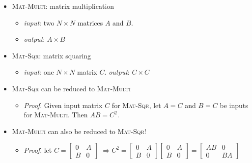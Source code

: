 \documentclass[10pt,landscape]{article}
\newcommand{\1}{\mathmybb{1}}
\begin{document}
\begin{multicols*}{3}
\begin{itemize}[topsep=0pt,noitemsep,wide=0pt, leftmargin=\dimexpr{} + 2\relax]
  \item \textsc{Mat-Multi}: matrix multiplication
    \begin{itemize}[topsep=0pt,noitemsep,wide=0pt, leftmargin=\dimexpr{} + 2\relax]
      \item \textit{input}: two $N \times N$ matrices  $A$ and $B$.
      \item \textit{output}: $A \times B$
    \end{itemize}
  \item \textsc{Mat-Sqr}: matrix squaring
    \begin{itemize}[topsep=0pt,noitemsep,wide=0pt, leftmargin=\dimexpr{} + 2\relax]
      \item \textit{input}: one $N \times N$ matrix $C$. \textit{output}: $C \times C$
    \end{itemize}
  \item \textsc{Mat-Sqr} can be reduced to \textsc{Mat-Multi}
    \begin{itemize}[topsep=0pt,noitemsep,wide=0pt, leftmargin=\dimexpr{} + 2\relax]
      \item \textit{Proof}. Given input matrix $C$ for \textsc{Mat-Sqr}, let $A=C$ and  $B=C$ be inputs for \textsc{Mat-Multi}. Then $AB=C^2$.
    \end{itemize}
  \item \textsc{Mat-Multi} can also be reduced to \textsc{Mat-Sqr}!
    \begin{itemize}[topsep=0pt,noitemsep,wide=0pt, leftmargin=\dimexpr{} + 2\relax]
      \item \textit{Proof}. let $C = \left[ \begin{smallmatrix} 0 & A \\ B & 0 \end{smallmatrix} \right]$
        $\Rightarrow C^2 = \left[\begin{smallmatrix} 0 & A \\ B & 0 \end{smallmatrix}\right] \left[\begin{smallmatrix} 0 & A \\ B & 0 \end{smallmatrix}\right] = \left[ \begin{smallmatrix} AB & 0 \\ 0 & BA \end{smallmatrix} \right] $
    \end{itemize}
\end{itemize}


\end{multicols*}
\end{document}

